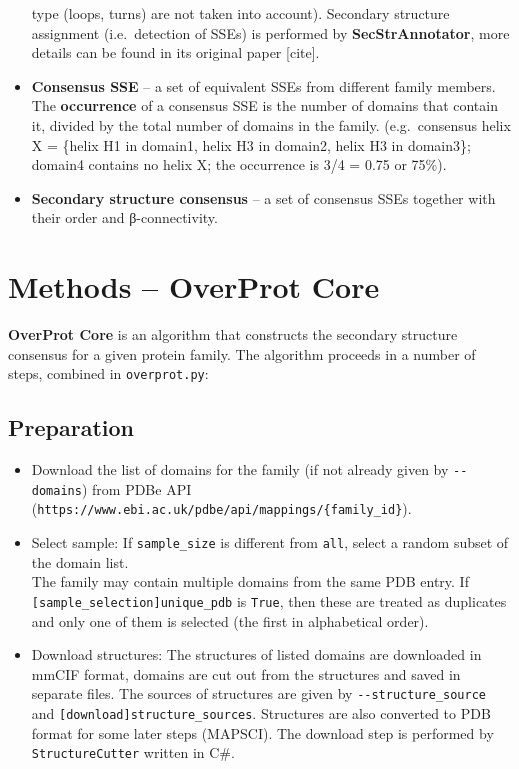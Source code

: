 \documentclass[12pt,draft]{article}
\let\oldtexttt\texttt
\renewcommand{\texttt}[1]{\textcolor{CodeColor}{\oldtexttt{#1}}}
\begin{document}
\begin{itemize}
  type (loops, turns) are not taken into account). Secondary structure
  assignment (i.e.~detection of SSEs) is performed by
  \textbf{SecStrAnnotator}, more details can be found in its original
  paper {[}cite{]}.
\item
  \textbf{Consensus SSE} -- a set of equivalent SSEs from different
  family members. The \textbf{occurrence} of a consensus SSE is the
  number of domains that contain it, divided by the total number of
  domains in the family. (e.g.~consensus helix X = \{helix H1 in
  domain1, helix H3 in domain2, helix H3 in domain3\}; domain4 contains
  no helix X; the occurrence is 3/4 = 0.75 or 75\%).
\item
  \textbf{Secondary structure consensus} -- a set of consensus SSEs
  together with their order and β-connectivity.
\end{itemize}

\hypertarget{methods-overprot-core}{%
\section{Methods -- OverProt Core}\label{methods-overprot-core}}

\textbf{OverProt Core} is an algorithm that constructs the secondary
structure consensus for a given protein family. The algorithm proceeds
in a number of steps, combined in \texttt{overprot.py}:

\hypertarget{preparation}{%
\subsection{Preparation}\label{preparation}}

\begin{itemize}
\item
  Download the list of domains for the family (if not already given by
  \texttt{-\/-domains}) from PDBe API
  (\texttt{https://www.ebi.ac.uk/pdbe/api/mappings/\{family\_id\}}).
\item
  Select sample: If \texttt{sample\_size} is different from
  \texttt{all}, select a random subset of the domain list.\\
  The family may contain multiple domains from the same PDB entry. If
  \texttt{{[}sample\_selection{]}unique\_pdb} is \texttt{True}, then
  these are treated as duplicates and only one of them is selected (the
  first in alphabetical order).
\item
  Download structures: The structures of listed domains are downloaded
  in mmCIF format, domains are cut out from the structures and saved in
  separate files. The sources of structures are given by
  \texttt{-\/-structure\_source} and
  \texttt{{[}download{]}structure\_sources}. Structures are also
  converted to PDB format for some later steps (MAPSCI). The download
  step is performed by \texttt{StructureCutter} written in C\#.
\end{itemize}
\end{document}
